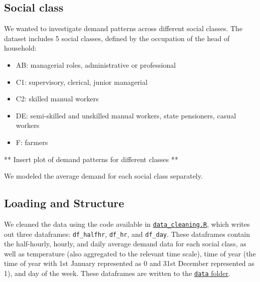 \documentclass[
]{article}
\newenvironment{Shaded}{\begin{snugshade}}{\end{snugshade}}
\newcommand{\CommentTok}[1]{\textcolor[rgb]{0.56,0.35,0.01}{\textit{#1}}}
\newcommand{\FunctionTok}[1]{\textcolor[rgb]{0.13,0.29,0.53}{\textbf{#1}}}
\newcommand{\NormalTok}[1]{#1}
\newcommand{\OtherTok}[1]{\textcolor[rgb]{0.56,0.35,0.01}{#1}}
\newcommand{\SpecialCharTok}[1]{\textcolor[rgb]{0.81,0.36,0.00}{\textbf{#1}}}
\newcommand{\StringTok}[1]{\textcolor[rgb]{0.31,0.60,0.02}{#1}}
\providecommand{\tightlist}{%
  \setlength{\itemsep}{0pt}\setlength{\parskip}{0pt}}
\begin{document}
\hypertarget{social-class}{%
\subsection{Social class}\label{social-class}}

We wanted to investigate demand patterns across different social
classes. The dataset includes 5 social classes, defined by the
occupation of the head of household:

\begin{itemize}
\tightlist
\item
  AB: managerial roles, administrative or professional
\item
  C1: supervisory, clerical, junior managerial
\item
  C2: skilled manual workers
\item
  DE: semi-skilled and unskilled manual workers, state pensioners,
  casual workers
\item
  F: farmers
\end{itemize}

\begin{Shaded}
\end{Shaded}

** Insert plot of demand patterns for different classes **

We modeled the average demand for each social class separately.

\hypertarget{loading-and-structure}{%
\subsection{Loading and Structure}\label{loading-and-structure}}

We cleaned the data using the code available in
\href{https://github.com/Shermjj/SC-2-Electric-Boogalo/blob/main/data_cleaning.R}{\texttt{data\_cleaning.R}},
which writes out three dataframes: \texttt{df\_halfhr}, \texttt{df\_hr},
and \texttt{df\_day}. These dataframes contain the half-hourly, hourly,
and daily average demand data for each social class, as well as
temperature (also aggregated to the relevant time scale), time of year
(the time of year with 1st January represented as 0 and 31st December
represented as 1), and day of the week. These dataframes are written to
the
\href{https://github.com/Shermjj/SC-2-Electric-Boogalo/tree/main/data}{\texttt{data}
folder}.
\end{document}
